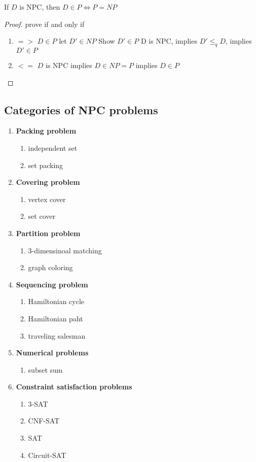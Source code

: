 \documentclass[11pt]{article}
\begin{document}
\begin{theorem*}
    If $D$ is NPC, then $D\in P \iff P=NP$
    \begin{proof}
        prove if and only if
        \begin{enumerate}
            \item $=>$ $D\in P$ let $D' \in NP$ Show $D' \in P$ D is NPC, implies $D' \leq_q D$, implies $D' \in P$
            \item $<=$ $D$ is NPC implies $D\in NP = P$ implies $D\in P$
        \end{enumerate}
    \end{proof}
\end{theorem*}

\subsection*{Categories of NPC problems}


\begin{enumerate}
    \item \textbf{Packing problem} 
    \begin{enumerate}
        \item independent set
        \item set packing 
    \end{enumerate}
    \item \textbf{Covering problem}
    \begin{enumerate}
        \item vertex cover 
        \item set cover
    \end{enumerate}
    \item \textbf{Partition problem}
    \begin{enumerate}
        \item 3-dimensinoal matching
        \item graph coloring
    \end{enumerate}
    \item \textbf{Sequencing problem}
    \begin{enumerate}
        \item Hamiltonian cycle
        \item Hamiltonian paht
        \item traveling salesman
    \end{enumerate}
    \item \textbf{Numerical problems}
    \begin{enumerate}
        \item subset sum 
    \end{enumerate}
    \item \textbf{Constraint satisfaction problems}
    \begin{enumerate}
        \item 3-SAT
        \item CNF-SAT 
        \item SAT 
        \item Circuit-SAT
    \end{enumerate}
\end{enumerate}
\end{document}

